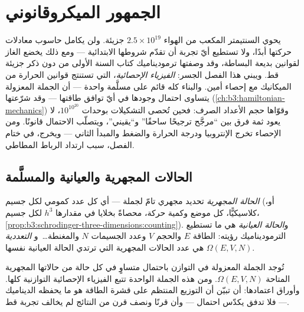 \chapter{الجمهور الميكروقانوني}\label{ch:b3:microcanonical-ensemble}

يحوي السنتيمتر المكعب من الهواء $2.5\times10^{19}$ جزيئة. ولن
يكامل حاسوب معادلات حركتها أبدًا، ولا تستطيع أيّ
تجربة أن تقدّم شروطها الابتدائية --- ومع ذلك يخضع الغاز
لقوانين بديعة البساطة، وقد وصفتها ترموديناميك كتاب السنة
الأولى من دون ذكر جزيئة قط. ويبني هذا الفصل الجسر:
\emph{الفيزياء الإحصائية}، التي تستنتج قوانين الحرارة من
الميكانيك مع إحصاء أمين. والبناء كله قائم على مسلَّمة واحدة ---
أن الجملة المعزولة يتساوى احتمال وجودها في أيّ  توافق
طاقتها --- وقد شرّعتها 
(\cref{ch:b3:hamiltonian-mechanics}) وقوّاها حجم
الأعداد الصرف: فحين تُحصى التشكيلات بوحدات
$10^{10^{20}}$، لا يعود ثمة فرق بين ``مرجَّح ترجيحًا ساحقًا''
و``يقيني''، ويتصلّب الاحتمال قانونًا. ومن الإحصاء تخرج
الإنتروبيا ودرجة الحرارة والضغط والمبدأ الثاني ---
ويخرج، في ختام الفصل، سبب ارتداد الرباط المطاطي.

\section{الحالات المجهرية والعيانية والمسلَّمة}

\begin{definition}\label{def:b3:microcanonical-ensemble:states}
\emph{الحالة المجهرية} تحديد مجهري تامّ
لجملة --- أي كل عدد كمومي لكل جسيم (أو، كلاسيكيًّا،
كل موضع وكمية حركة، محصاةً بخلايا في  مقدارها $h^3$
لكل جسيم، \cref{prop:b3:schrodinger-three-dimensions:counting}).
و\emph{الحالة العيانية} هي ما تستطيع الترموديناميك رؤيته: الطاقة $E$
والحجم $V$ وعدد الجسيمات $N$ والمغنطة\dots\ و
\emph{التعددية} $\Omega(E, V, N)$ هي عدد الحالات المجهرية
التي ترتدي الحالة العيانية نفسها.
\end{definition}

\begin{theorem}\label{thm:b3:microcanonical-ensemble:postulate}
تُوجد الجملة المعزولة في التوازن باحتمال متساوٍ في
كل حالة من حالاتها المجهرية المتاحة $\Omega(E, V, N)$. ومن هذه
الجملة الواحدة تتبع الفيزياء الإحصائية التوازنية كلها.
وأوراق اعتمادها: أن  تبيّن أن التوزيع المنتظم
على قشرة الطاقة هو ما يحفظه الديناميك --- فلا تدفق
يكدّس احتمال  --- وأن قرنًا ونصف قرن من
النتائج لم يخالف تجربة قط.
\end{theorem}
\admitted


